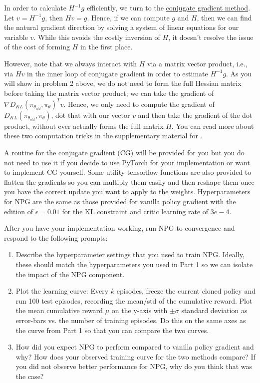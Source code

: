 \documentclass[12pt]{article}
\begin{document}
In order to calculate $H^{-1}g$ efficiently, we turn to the \href{https://en.wikipedia.org/wiki/Conjugate_gradient_method}{conjugate gradient method}.  Let $v = H^{-1}g$, then $Hv = g$.  Hence, if we can compute $g$ and $H$, then we can find the natural gradient direction by solving a system of linear equations for our variable $v$.  While this avoids the costly inversion of $H$, it doesn't resolve the issue of the cost of forming $H$ in the first place.  

However, note that we always interact with $H$ via a matrix vector product, i.e., via $Hv$ in the inner loop of conjugate gradient in order to estimate $H^{-1}g$. As you will show in problem 2 above, we do not need to form the full Hessian matrix before taking the matrix vector product; we can take the gradient of $\nabla D_{KL}(\pi_{\theta_{old}},\pi_\theta)^Tv$.  Hence, we only need to compute the gradient of $D_{KL}(\pi_{\theta_{old}},\pi_\theta)$, dot that with our vector $v$ and then take the gradient of the dot product, without ever actually forms the full matrix $H$.  You can read more about these two computation tricks in the supplementary material for \cite{DBLP:journals/corr/SchulmanLMJA15}.

A routine for the conjugate gradient (CG) will be provided for you but you do not need to use it if you decide to use PyTorch for your implementation or want to implement CG yourself.  Some utility tensorflow functions are also provided to flatten the gradients so you can multiply them easily and then reshape them once you have the correct update you want to apply to the weights.  Hyperparameters for NPG are the same as those provided for vanilla policy gradient with the edition of $\epsilon=0.01$ for the KL constraint and critic learning rate of $3e-4$.

After you have your implementation working, run NPG to convergence and respond to the following prompts:
\begin{enumerate}
\item Describe the hyperparameter settings that you used to train NPG.  Ideally, these should match the hyperparameters you used in Part 1 so we can isolate the impact of the NPG component.
 \begin{solution}
\end{solution}
\item  Plot the learning curve: Every $k$ episodes, freeze the current cloned policy and run 100 test episodes, recording the mean/std of the cumulative reward. Plot the mean cumulative reward $\mu$ on the y-axis with $\pm \sigma$ standard deviation as error-bars vs. the number of training episodes.  Do this on the same axes as the curve from Part 1 so that you can compare the two curves.  
 \begin{solution}
\end{solution}
\item How did you expect NPG to perform compared to vanilla policy gradient and why?  How does your observed training curve for the two methods compare?  If you did not observe better performance for NPG, why do you think that was the case?
\begin{solution}
\end{solution}
\end{enumerate}
\end{document}
